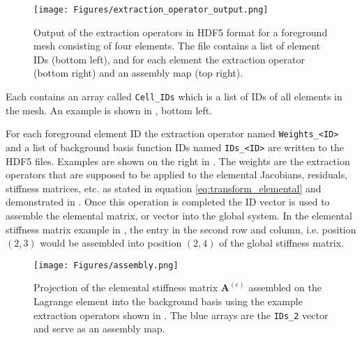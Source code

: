 
\begin{figure}[h]
    \vspace{0.5cm}
    \begin{center}
    \texttt{[image: Figures/extraction\_operator\_output.png]}
    \caption{Output of the extraction operators in HDF5 format for a foreground mesh consisting of four elements. The file contains a list of element IDs (bottom left), and for each element the extraction operator (bottom right) and an assembly map (top right).} 
    \label{fig:extraction_operator_output}
    \end{center}
\end{figure}

Each contains an array called \texttt{Cell\_IDs} which is a list of IDs of all elements in the mesh. An example is shown in , bottom left. 

For each foreground element ID the extraction operator named \texttt{Weights\_<ID>} and a list of background basis function IDs named \texttt{IDs\_<ID>} are written to the HDF5 files. Examples are shown on the right in . The weights are the extraction operators that are supposed to be applied to the elemental Jacobians, residuals, stiffness matrices, etc. as stated in equation \eqref{eq:transform_elemental} and demonstrated in . Once this operation is completed the ID vector is used to assemble the elemental matrix, or vector into the global system. In the elemental stiffness matrix example in , the entry in the second row and column, i.e. position $(2,3)$ would be assembled into position $(2,4)$ of the global stiffness matrix.

\begin{figure}[h]
    \begin{center}
    \texttt{[image: Figures/assembly.png]}
    \caption{Projection of the elemental stiffness matrix $\bm{A}^{(e)}$ assembled on the Lagrange element into the background basis using the example extraction operators shown in . The blue arrays are the \texttt{IDs\_2} vector and serve as an assembly map.} 
    \label{fig:assembly}
    \end{center}
\end{figure}



